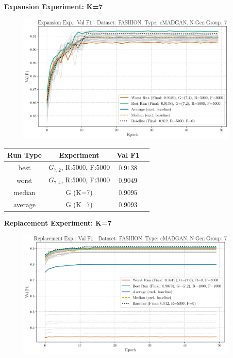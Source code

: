 \newpage
\noindent\textbf{Expansion Experiment: K=7}
\begin{figure}[htbp]
	\centering
	\includegraphics[width=.85\textwidth]{abb/strat_classifier_performance/FASHION_STRATIFIED_CLASSIFIERS_cMADGAN_NEW/expansion_experiments/val_f1_score_cMADGAN_FASHION_n_gen_7_all.png}
	\label{fig:app_strat_class_performance_expansion_exp._val_f1_score_7}
\end{figure}
\begin{table}[H]
	\vspace{-1em}
	\centering
	\begin{tabular}{|c|c|c|c|}
		\hline
		Run Type & Experiment & Val F1 \\ \hline
		best & \(G_{7, 2}\), R:5000, F:5000 & $0.9138$\\ \hline
		worst & \(G_{7, 4}\), R:5000, F:3000 & $0.9049$\\ \hline
		median & G (K=7) & $0.9095$\\ \hline
		average & G (K=7) & $0.9093$
		\\ \hline
	\end{tabular}
\end{table}
\noindent\textbf{Replacement Experiment: K=7}
\begin{figure}[htbp]
	\centering
	\includegraphics[width=.85\textwidth]{abb/strat_classifier_performance/FASHION_STRATIFIED_CLASSIFIERS_cMADGAN_NEW/replacement_experiments/val_f1_score_cMADGAN_FASHION_n_gen_7_all.png}
	\label{fig:app_strat_class_performance_replacement_exp._val_f1_score_7}
\end{figure}
